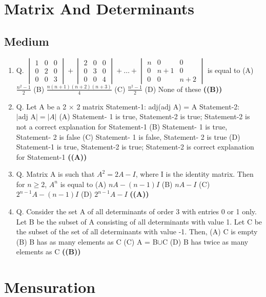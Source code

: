 \documentclass{article}
\begin{document}
\section{Matrix And Determinants}
\subsection{Medium}
\begin{enumerate}
\item Q. $\begin{vmatrix} 1 & 0 & 0 \\ 0 & 2 & 0 \\ 0 & 0 & 3 \end{vmatrix} + \begin{vmatrix} 2 & 0 & 0 \\ 0 & 3 & 0 \\ 0 & 0 & 4 \end{vmatrix} + \dots + \begin{vmatrix} n & 0 & 0 \\ 0 & n+1 & 0 \\ 0 & 0 & n+2 \end{vmatrix}$ is equal to
(A) $\frac{n^2-1}{2}$
(B) $\frac{n(n+1)(n+2)(n+3)}{4}$
(C) $\frac{n^2-1}{2}$
(D) None of these \hfill \textbf{((B))}
\item Q. Let A be a 2 $\times$ 2 matrix
Statement-1: adj(adj A) = A
Statement-2: $|\text{adj A}| = |A|$
(A) Statement- 1 is true, Statement-2 is true; Statement-2 is not a correct explanation for Statement-1
(B) Statement- 1 is true, Statement- 2 is false
(C) Statement- 1 is false, Statement- 2 is true
(D) Statement-1 is true, Statement-2 is true; Statement-2 is correct explanation for Statement-1 \hfill \textbf{((A))}
\item Q. Matrix A is such that $A^2 = 2A - I$, where I is the identity matrix. Then for $n \ge 2$, $A^n$ is equal to
(A) $nA - (n - 1)I$
(B) $nA - I$
(C) $2^{n-1}A - (n - 1)I$
(D) $2^{n-1}A - I$ \hfill \textbf{((A))}
\item Q. Consider the set A of all determinants of order 3 with entries 0 or 1 only. Let B be the subset of A consisting of all determinants with value 1. Let C be the subset of the set of all determinants with value -1. Then,
(A) C is empty
(B) B has as many elements as C
(C) A = B$\cup$C
(D) B has twice as many elements as C \hfill \textbf{((B))}
\end{enumerate}
\section{Mensuration}
\end{document}
